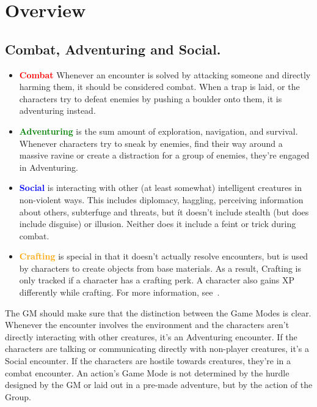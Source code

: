 \chapter{Overview}\label{ch:gameModeOverview}
\section{Combat, Adventuring and Social.}\label{sec:gameModeList}
\begin{itemize}
	\item \textcolor{red}{\textbf{Combat}} Whenever an encounter is solved by attacking someone and directly harming them, it should be considered combat.
	When a trap is laid, or the characters try to defeat enemies by pushing a boulder onto them, it is adventuring instead.

	\item \textcolor{green}{\textbf{Adventuring}} is the sum amount of exploration, navigation, and survival.
	Whenever characters try to sneak by enemies, find their way around a massive ravine or create a distraction for a group of enemies, they're engaged in Adventuring.

	\item \textcolor{blue}{\textbf{Social}} is interacting with other (at least somewhat) intelligent creatures in non-violent ways.
	This includes diplomacy, haggling, perceiving information about others, subterfuge and threats, but ít doesn't include stealth (but does include disguise) or illusion. 
	Neither does it include a feint or trick during combat.

	\item \textcolor{orange}{\textbf{Crafting}} is special in that it doesn't actually resolve encounters, but is used by characters to create objects from base materials.
	As a result, Crafting is only tracked if a character has a crafting perk.
	A character also gains XP differently while crafting.
	For more information, see~.
	
\end{itemize}

The GM should make sure that the distinction between the Game Modes is clear. 
Whenever the encounter involves the environment and the characters aren't directly interacting with other creatures, it's an Adventuring encounter.
If the characters are talking or communicating directly with non-player creatures, it's a Social encounter.
If the characters are hostile towards creatures, they're in a combat encounter.
An action's Game Mode is not determined by the hurdle designed by the GM or laid out in a pre-made adventure, but by the action of the Group.

